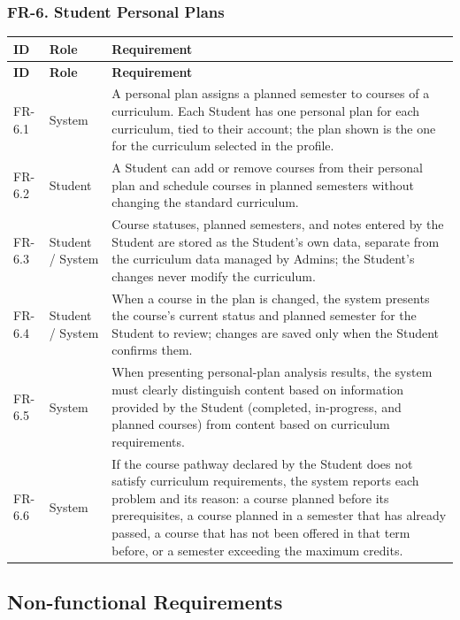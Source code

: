 \subsubsection{FR-6. Student Personal Plans}
\begin{longtable}{|p{}|p{}|p{}|}
\hline
\textbf{ID} & \textbf{Role} & \textbf{Requirement} \\
\hline
\endfirsthead
\hline
\textbf{ID} & \textbf{Role} & \textbf{Requirement} \\
\hline
\endhead
FR-6.1 & System & A personal plan assigns a planned semester to courses of a curriculum. Each Student has one personal plan for each curriculum, tied to their account; the plan shown is the one for the curriculum selected in the profile. \\
\hline
FR-6.2 & Student & A Student can add or remove courses from their personal plan and schedule courses in planned semesters without changing the standard curriculum. \\
\hline
FR-6.3 & Student / System & Course statuses, planned semesters, and notes entered by the Student are stored as the Student's own data, separate from the curriculum data managed by Admins; the Student's changes never modify the curriculum. \\
\hline
FR-6.4 & Student / System & When a course in the plan is changed, the system presents the course's current status and planned semester for the Student to review; changes are saved only when the Student confirms them. \\
\hline
FR-6.5 & System & When presenting personal-plan analysis results, the system must clearly distinguish content based on information provided by the Student (completed, in-progress, and planned courses) from content based on curriculum requirements. \\
\hline
FR-6.6 & System & If the course pathway declared by the Student does not satisfy curriculum requirements, the system reports each problem and its reason: a course planned before its prerequisites, a course planned in a semester that has already passed, a course that has not been offered in that term before, or a semester exceeding the maximum credits. \\
\hline
\end{longtable}

\subsection{Non-functional Requirements}

